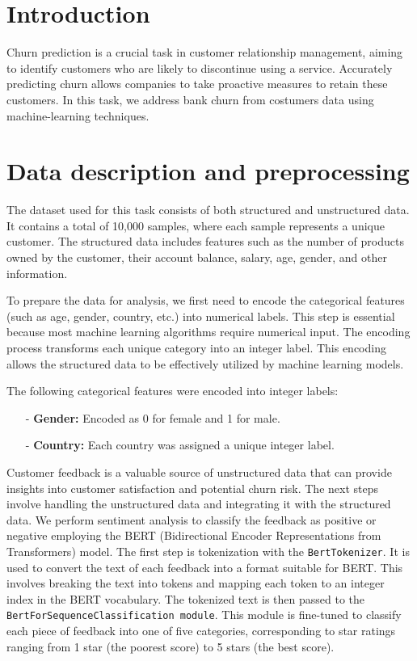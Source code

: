 \documentclass[12pt]{article}
\begin{document}
\section{Introduction}
Churn prediction is a crucial task in customer relationship management, aiming to identify customers who are likely to discontinue using a service. Accurately predicting churn allows companies to take proactive measures to retain these customers. In this task, we address bank churn from costumers data using machine-learning techniques. 

\section{Data description and preprocessing}
The dataset used for this task consists of both structured and unstructured data. It contains a total of 10,000 samples, where each sample represents a unique customer. The structured data includes features such as the number of products owned by the customer, their account balance, salary, age, gender, and other information. 

To prepare the data for analysis, we first need to encode the categorical features (such as age, gender, country, etc.) into numerical labels. This step is essential because most machine learning algorithms require numerical input. The encoding process transforms each unique category into an integer label. This encoding allows the structured data to be effectively utilized by machine learning models.

The following categorical features were encoded into integer labels:
\begin{itemize}
    \item[-] \textbf{Gender:} Encoded as 0 for female and 1 for male.
    \item[-] \textbf{Country:} Each country was assigned a unique integer label.
\end{itemize}
 
Customer feedback is a valuable source of unstructured data that can provide insights into customer satisfaction and potential churn risk. The next steps involve handling the unstructured data and integrating it with the structured data. We perform sentiment analysis to classify the feedback as positive or negative employing the BERT (Bidirectional Encoder Representations from Transformers) model. The first step is tokenization with the \texttt{BertTokenizer}. It is used to convert the text of each feedback into a format suitable for BERT. This involves breaking the text into tokens and mapping each token to an integer index in the BERT vocabulary. The tokenized text is then passed to the \texttt{BertForSequenceClassification module}. This module is fine-tuned to classify each piece of feedback into one of five categories, corresponding to star ratings ranging from 1 star (the poorest score) to 5 stars (the best score).
\end{document}

